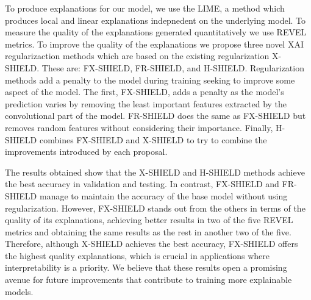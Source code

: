 To produce explanations for our model, we use the LIME, a method which produces local and linear explanations indepnedent on the underlying model. To measure the quality of the explanations generated quantitatively we use REVEL metrics. To improve the quality of the explanations we propose three novel XAI regularizaction methods which are based on the existing regularization X-SHIELD. These are: FX-SHIELD, FR-SHIELD, and H-SHIELD. Regularization methods add a penalty to the model during training seeking to improve some aspect of the model. The first, FX-SHIELD, adds a penalty as the model's prediction varies by removing the least important features extracted by the convolutional part of the model. FR-SHIELD does the same as FX-SHIELD but removes random features without considering their importance. Finally, H-SHIELD combines FX-SHIELD and X-SHIELD to try to combine the improvements introduced by each proposal.


The results obtained show that the X-SHIELD and H-SHIELD methods achieve the best accuracy in validation and testing. In contrast, FX-SHIELD and FR-SHIELD manage to maintain the accuracy of the base model without using regularization. However, FX-SHIELD stands out from the others in terms of the quality of its explanations, achieving better results in two of the five REVEL metrics and obtaining the same results as the rest in another two of the five. Therefore, although X-SHIELD achieves the best accuracy, FX-SHIELD offers the highest quality explanations, which is crucial in applications where interpretability is a priority. We believe that these results open a promising avenue for future improvements that contribute to training more explainable models. 

\thispagestyle{empty}


\endinput
